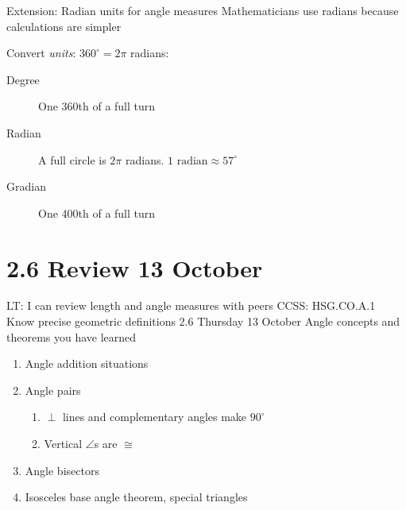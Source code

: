 \documentclass[onlytextwidth]{beamer}
\begin{document}
\begin{frame}{Extension: Radian units for angle measures}
  {Mathematicians use radians because calculations are simpler}
    \begin{center}
    \end{center}
  Convert \emph{units}: $360^\circ = 2 \pi$ radians:
    \begin{description}
      \item[Degree] One 360th of a full turn
      \item[Radian] A full circle is $2\pi$ radians. $1 \text{ radian} \approx 57^\circ$
      \item[Gradian] One 400th of a full turn
    \end{description}
  \end{frame}
  
\section{2.6 Review \hfill 13 October}
\begin{frame}{LT: I can review length and angle measures with peers}
  {CCSS: HSG.CO.A.1 Know precise geometric definitions  \hfill \alert{2.6 Thursday 13 October}}
  Angle concepts and theorems you have learned
  \begin{enumerate}
    \item Angle addition situations
    \item Angle pairs
    \begin{enumerate}
      \item $\perp$ lines and complementary angles make $90^\circ$
      \item Vertical $\angle$s are $\cong$
    \end{enumerate}
    \item Angle bisectors
    \item Isosceles base angle theorem, special triangles
  \end{enumerate}
\end{frame}
\end{document}
